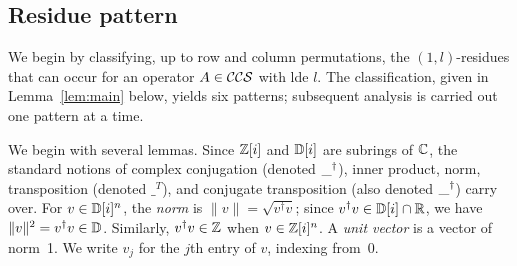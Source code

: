 \documentclass[reprint,amsmath,amssymb,aps,pra]{revtex4-2}
\begin{document}
\subsection{Residue pattern}

We begin by classifying, up to row and column permutations, the
$(1,l)$-residues that can occur for an operator $A \in {\mathcal{CCS}}$
with lde $l$. The classification, given in Lemma~\ref{lem:main} below,
yields six patterns; subsequent analysis is carried out one pattern at
a time.

We begin with several lemmas. Since $\mathbb{Z} [i]$ and ${\mathbb D} [i]$ are subrings of
${\mathbb C}$, the standard notions of complex conjugation (denoted
$\_^{\dagger}$), inner product, norm, transposition (denoted $\_^T$), and
conjugate transposition (also denoted $\_^{\dagger}$) carry over. For
$v \in {\mathbb D} [i]^n$, the \emph{norm} is $\|v\| = \sqrt{v^{\dagger}v}$;
since $v^{\dagger}v \in {\mathbb D}[i] \cap {\mathbb R}$, we have
$\|v\|^2 = v^{\dagger}v \in {\mathbb D}$. Similarly, $v^{\dagger}v \in \mathbb{Z}$
when $v \in \mathbb{Z} [i]^n$. A \emph{unit vector} is a vector of norm~1. We
write $v_j$ for the $j$th entry of $v$, indexing from~$0$.
\end{document}
